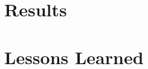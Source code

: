 \documentclass{prog_report}
\begin{document}
\section{Results}



\section{Lessons Learned}




\end{document}
